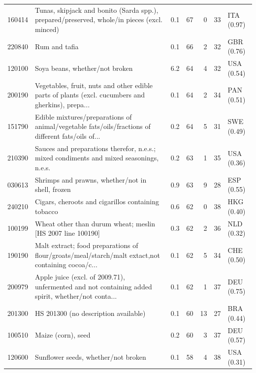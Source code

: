 \begin{tabular}{@{}l p{6.4cm} r r r r l@{}}
160414 & Tunas, skipjack and bonito (Sarda spp.), prepared/\allowbreak{}preserved, whole/\allowbreak{}in pieces (excl. minced) & 0.1 & 67 & 0 & 33 & ITA (0.97) \\
220840 & Rum and tafia & 0.1 & 66 & 2 & 32 & GBR (0.76) \\
120100 & Soya beans, whether/\allowbreak{}not broken & 6.2 & 64 & 4 & 32 & USA (0.54) \\
200190 & Vegetables, fruit, nuts and other edible parts of plants (excl. cucumbers and gherkins), prepa... & 0.1 & 64 & 2 & 34 & PAN (0.51) \\
151790 & Edible mixtures/\allowbreak{}preparations of animal/\allowbreak{}vegetable fats/\allowbreak{}oils/\allowbreak{}fractions of different fats/\allowbreak{}oils of... & 0.2 & 64 & 5 & 31 & SWE (0.49) \\
210390 & Sauces and preparations therefor, n.e.s.; mixed condiments and mixed seasonings, n.e.s. & 0.2 & 63 & 1 & 35 & USA (0.36) \\
030613 & Shrimps and prawns, whether/\allowbreak{}not in shell, frozen & 0.9 & 63 & 9 & 28 & ESP (0.55) \\
240210 & Cigars, cheroots and cigarillos containing tobacco & 0.6 & 62 & 0 & 38 & HKG (0.40) \\
100199 & Wheat other than durum wheat; meslin [HS 2007 line 100190] & 0.3 & 62 & 2 & 36 & NLD (0.32) \\
190190 & Malt extract; food preparations of flour/\allowbreak{}groats/\allowbreak{}meal/\allowbreak{}starch/\allowbreak{}malt extact,not containing cocoa/\allowbreak{}c... & 0.1 & 62 & 5 & 34 & CHE (0.50) \\
200979 & Apple juice (excl. of 2009.71), unfermented and not containing added spirit, whether/\allowbreak{}not conta... & 0.1 & 62 & 1 & 37 & DEU (0.75) \\
201300 & HS 201300 (no description available) & 0.1 & 60 & 13 & 27 & BRA (0.44) \\
100510 & Maize (corn), seed & 0.2 & 60 & 3 & 37 & DEU (0.57) \\
120600 & Sunflower seeds, whether/\allowbreak{}not broken & 0.1 & 58 & 4 & 38 & USA (0.31) \\
\bottomrule
\end{tabular}
